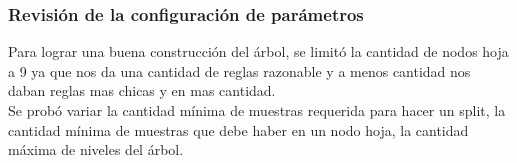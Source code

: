     \subsubsection{Revisión de la configuración de parámetros}
        Para lograr una buena construcción del árbol, se limitó la cantidad de
        nodos hoja a 9 ya que nos da una cantidad de reglas razonable y a menos
        cantidad nos daban reglas mas chicas y en mas cantidad.\\
        Se probó variar la cantidad mínima de muestras requerida para hacer
        un split, la cantidad mínima de muestras que debe haber en un nodo
        hoja, la cantidad máxima de niveles del árbol.

